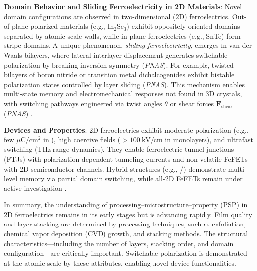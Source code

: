 \documentclass[a4paper,fleqn]{cas-sc}
\begin{document}
\par \textbf{Domain Behavior and Sliding Ferroelectricity in 2D Materials}: Novel domain configurations are observed in two-dimensional ($2$D) ferroelectrics. Out-of-plane polarized materials (e.g., In$_{2}$Se$_{3}$) exhibit oppositely oriented domains separated by atomic-scale walls, while in-plane ferroelectrics (e.g., SnTe) form stripe domains. A unique phenomenon, \textit{sliding ferroelectricity}, emerges in van der Waals bilayers, where lateral interlayer displacement generates switchable polarization by breaking inversion symmetry (\textit{PNAS}). For example, twisted bilayers of boron nitride or transition metal dichalcogenides exhibit bistable polarization states controlled by layer sliding (\textit{PNAS}). This mechanism enables multi-state memory and electromechanical responses not found in $3$D crystals, with switching pathways engineered via twist angles $\theta$ or shear forces $\mathbf{F}_{\text{shear}}$ (\textit{PNAS}) \cite{wu2021sliding}.

\par \textbf{Devices and Properties}: 2D ferroelectrics exhibit moderate polarization (e.g., few $\mu\mathrm{C}/\mathrm{cm}^2$ in ), high coercive fields ($>100~\mathrm{kV}/\mathrm{cm}$ in monolayers), and ultrafast switching (THz-range dynamics). They enable ferroelectric tunnel junctions (FTJs) with polarization-dependent tunneling currents and non-volatile FeFETs with 2D semiconductor channels. Hybrid structures (e.g., /) demonstrate multi-level memory via partial domain switching, while all-2D FeFETs remain under active investigation \cite{zhang2024new}.

\par In summary, the understanding of processing--microstructure--property (PSP) in 2D ferroelectrics remains in its early stages but is advancing rapidly. Film quality and layer stacking are determined by processing techniques, such as exfoliation, chemical vapor deposition (CVD) growth, and stacking methods. The structural characteristics—including the number of layers, stacking order, and domain configuration—are critically important. Switchable polarization is demonstrated at the atomic scale by these attributes, enabling novel device functionalities. 
\end{document}

